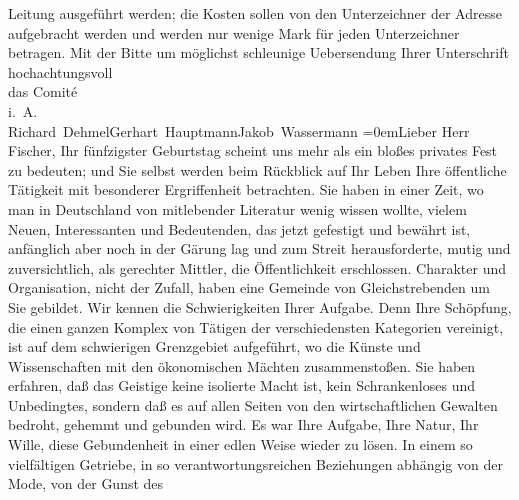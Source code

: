 {\begin{ledgroupsized}[t]{13cm}
                    Leitung ausgeführt werden; die Kosten sollen von den Unterzeichner der Adresse
                    aufgebracht werden und werden nur wenige Mark für jeden Unterzeichner
                    betragen.\pend
           \pstart
           Mit der Bitte um möglichst schleunige Uebersendung Ihrer Unterschrift\pend
           \pstart
           hochachtungsvoll{\\[\baselineskip]}das Comité{\\[\baselineskip]}i. A.{\\[\baselineskip]}\spacefill\mbox{Richard Dehmel\hspace*{1.5em}Gerhart Hauptmann\hspace*{1.5em}Jakob Wassermann}\pend
           \leftskip=0em{}\pstart{}{\pb}Lieber Herr Fischer,\pend\pstart
           Ihr fünfzigster Geburtstag scheint uns mehr als ein bloßes privates Fest zu
                    bedeuten; und Sie selbst werden beim Rückblick auf Ihr Leben Ihre öffentliche
                    Tätigkeit mit besonderer Ergriffenheit betrachten. Sie haben in einer Zeit, wo
                    man in Deutschland von mitlebender Literatur
                    wenig wissen wollte, vielem Neuen, Interessanten und Bedeutenden, das jetzt
                    gefestigt und bewährt ist, anfänglich aber noch in der Gärung lag und zum Streit
                    herausforderte, mutig und zuversichtlich, als gerechter Mittler, die
                    Öffentlichkeit erschlossen. Charakter und Organisation, nicht der Zufall, haben
                    eine Gemeinde von Gleichstrebenden um Sie gebildet. Wir kennen die
                    Schwierigkeiten Ihrer Aufgabe. Denn Ihre Schöpfung, die einen ganzen Komplex von
                    Tätigen der verschiedensten Kategorien vereinigt, ist auf dem schwierigen
                    Grenzgebiet aufgeführt, wo die Künste und Wissenschaften mit den ökonomischen
                    Mächten zusammenstoßen. Sie haben erfahren, daß das Geistige keine isolierte
                    Macht ist, kein Schrankenloses und Unbedingtes, sondern daß es auf allen Seiten
                    von den wirtschaftlichen Gewalten bedroht, gehemmt und gebunden wird. Es war
                    Ihre Aufgabe, Ihre Natur, Ihr Wille, {\pb}diese Gebundenheit in einer
                    edlen Weise wieder zu lösen. In einem so vielfältigen Getriebe, in so
                    verantwortungsreichen Beziehungen abhängig von der Mode, von der Gunst des

\end{ledgroupsized}}
